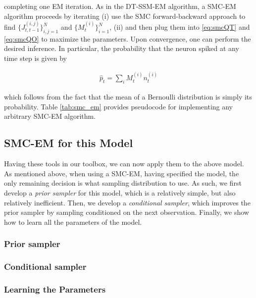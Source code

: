 \noindent completing one EM iteration.  As in the DT-SSM-EM algorithm, a SMC-EM algorithm proceeds by iterating (i) use the SMC forward-backward approach to find $\{J_{t,t-1}^{(i,j)}\}_{i,j=1}^N$ and $\{M_t^{(i)}\}_{i=1}^N$, (ii) and then plug them into \eqref{eq:smcQT} and \eqref{eq:smcQO} to maximize the parameters.  Upon convergence, one can perform the desired inference.  In particular, the probability that the neuron spiked at any time step is given by

\begin{align}
\widehat{p}_t = \sum_i M_t^{(i)} n_t^{(i)}
\end{align}

\noindent which follows from the fact that the mean of a Bernoulli distribution is simply its probability. Table \ref{tab:smc_em} provides pseudocode for implementing any arbitrary SMC-EM algorithm.

\subsection{SMC-EM for this Model}

Having these tools in our toolbox, we can now apply them to the above model. As mentioned above, when using a SMC-EM, having specified the model, the only remaining decision is what sampling distribution to use.  As such, we first develop a \emph{prior sampler} for this model, which is a relatively simple, but also relatively inefficient.  Then, we develop a \emph{conditional sampler}, which improves the prior sampler by sampling conditioned on the next observation. Finally, we show how to learn all the parameters of the model.



\subsubsection{Prior sampler}


\subsubsection{Conditional sampler}


\subsubsection{Learning the Parameters}


% 